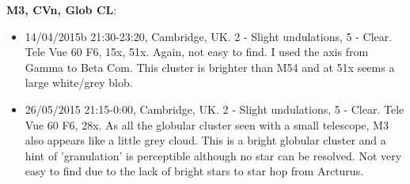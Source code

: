 {\bf M3, CVn, Glob CL}:
\begin{itemize}
\item 14/04/2015b 21:30-23:20, Cambridge, UK. 2 - Slight undulations, 5 - Clear. Tele Vue 60 F6, 15x, 51x. Again, not easy to find. I used the axis from Gamma to Beta Com. This cluster is brighter than M54 and at 51x seems a large white/grey blob. 
\item 26/05/2015 21:15-0:00, Cambridge, UK. 2 - Slight undulations, 5 - Clear. Tele Vue 60 F6, 28x. As all the globular cluster seen with a small telescope, M3 also appears like a little grey cloud. This is a bright globular cluster and a hint of 'granulation' is perceptible although no star can be resolved. Not very easy to find due to the lack of bright stars to star hop from Arcturus.
\end{itemize}
